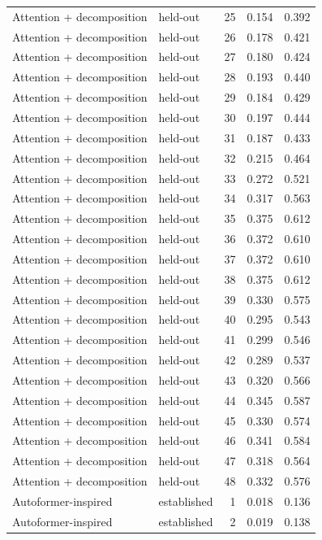 \begin{tabular}{llrrr}
Attention + decomposition & held-out & 25 & 0.154 & 0.392 \\
Attention + decomposition & held-out & 26 & 0.178 & 0.421 \\
Attention + decomposition & held-out & 27 & 0.180 & 0.424 \\
Attention + decomposition & held-out & 28 & 0.193 & 0.440 \\
Attention + decomposition & held-out & 29 & 0.184 & 0.429 \\
Attention + decomposition & held-out & 30 & 0.197 & 0.444 \\
Attention + decomposition & held-out & 31 & 0.187 & 0.433 \\
Attention + decomposition & held-out & 32 & 0.215 & 0.464 \\
Attention + decomposition & held-out & 33 & 0.272 & 0.521 \\
Attention + decomposition & held-out & 34 & 0.317 & 0.563 \\
Attention + decomposition & held-out & 35 & 0.375 & 0.612 \\
Attention + decomposition & held-out & 36 & 0.372 & 0.610 \\
Attention + decomposition & held-out & 37 & 0.372 & 0.610 \\
Attention + decomposition & held-out & 38 & 0.375 & 0.612 \\
Attention + decomposition & held-out & 39 & 0.330 & 0.575 \\
Attention + decomposition & held-out & 40 & 0.295 & 0.543 \\
Attention + decomposition & held-out & 41 & 0.299 & 0.546 \\
Attention + decomposition & held-out & 42 & 0.289 & 0.537 \\
Attention + decomposition & held-out & 43 & 0.320 & 0.566 \\
Attention + decomposition & held-out & 44 & 0.345 & 0.587 \\
Attention + decomposition & held-out & 45 & 0.330 & 0.574 \\
Attention + decomposition & held-out & 46 & 0.341 & 0.584 \\
Attention + decomposition & held-out & 47 & 0.318 & 0.564 \\
Attention + decomposition & held-out & 48 & 0.332 & 0.576 \\
Autoformer-inspired & established & 1 & 0.018 & 0.136 \\
Autoformer-inspired & established & 2 & 0.019 & 0.138 \\

\end{tabular}
